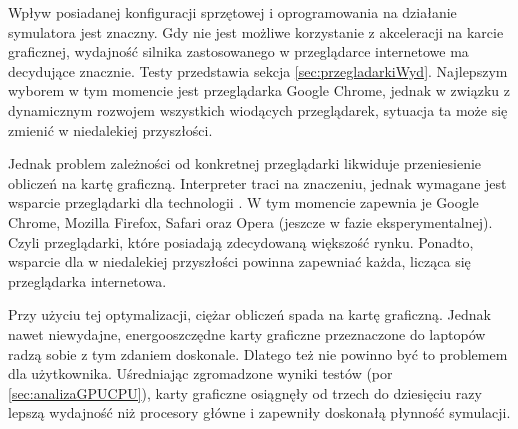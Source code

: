 Wpływ posiadanej konfiguracji sprzętowej i oprogramowania na działanie
symulatora jest znaczny. Gdy nie jest możliwe korzystanie z akceleracji na
karcie graficznej, wydajność silnika  zastosowanego w
przeglądarce internetowe ma decydujące znacznie. Testy przedstawia sekcja
\ref{sec:przegladarkiWyd}. Najlepszym wyborem w tym momencie jest przeglądarka
Google Chrome, jednak w związku z dynamicznym rozwojem wszystkich wiodących
przeglądarek, sytuacja ta może się zmienić w niedalekiej przyszłości.

Jednak problem zależności od konkretnej przeglądarki likwiduje przeniesienie
obliczeń na kartę graficzną. Interpreter  traci na znaczeniu,
jednak wymagane jest wsparcie przeglądarki dla technologii . W tym
momencie zapewnia je Google Chrome, Mozilla Firefox, Safari oraz Opera (jeszcze
w fazie eksperymentalnej). Czyli przeglądarki, które posiadają zdecydowaną
większość rynku. Ponadto, wsparcie dla  w niedalekiej przyszłości
powinna zapewniać każda, licząca się przeglądarka internetowa.

Przy użyciu tej optymalizacji, ciężar obliczeń spada na kartę graficzną. Jednak
nawet niewydajne, energooszczędne karty graficzne przeznaczone do laptopów radzą
sobie z tym zdaniem doskonale. Dlatego też nie powinno być to problemem dla
użytkownika. Uśredniając zgromadzone wyniki testów (por
\ref{sec:analizaGPUCPU}), karty graficzne osiągnęły od trzech do dziesięciu razy
lepszą wydajność niż procesory główne i zapewniły doskonałą płynność symulacji.

